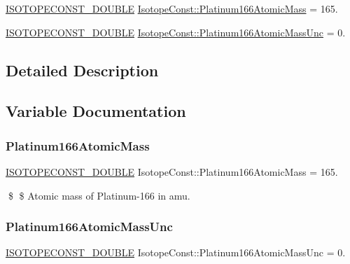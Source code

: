 \begin{DoxyCompactItemize}
\item 
\mbox{\hyperlink{group___isotope_const-_macros_ga8f45a7272ce02c0b4c65c44636ed719a}{I\+S\+O\+T\+O\+P\+E\+C\+O\+N\+S\+T\+\_\+\+D\+O\+U\+B\+LE}} \mbox{\hyperlink{group___isotope_const-_platinum-_pt166_ga0bc204d36fd2ba76383b62f562e490cd}{Isotope\+Const\+::\+Platinum166\+Atomic\+Mass}} = 165.
\item 
\mbox{\hyperlink{group___isotope_const-_macros_ga8f45a7272ce02c0b4c65c44636ed719a}{I\+S\+O\+T\+O\+P\+E\+C\+O\+N\+S\+T\+\_\+\+D\+O\+U\+B\+LE}} \mbox{\hyperlink{group___isotope_const-_platinum-_pt166_gaa3c386d9a4e07d93b30e23107e2c21b8}{Isotope\+Const\+::\+Platinum166\+Atomic\+Mass\+Unc}} = 0.
\end{DoxyCompactItemize}


\subsection{Detailed Description}


\subsection{Variable Documentation}
\mbox{\label{group___isotope_const-_platinum-_pt166_ga0bc204d36fd2ba76383b62f562e490cd}} 
\subsubsection{\texorpdfstring{Platinum166\+Atomic\+Mass}{Platinum166AtomicMass}}
{\footnotesize\ttfamily \mbox{\hyperlink{group___isotope_const-_macros_ga8f45a7272ce02c0b4c65c44636ed719a}{I\+S\+O\+T\+O\+P\+E\+C\+O\+N\+S\+T\+\_\+\+D\+O\+U\+B\+LE}} Isotope\+Const\+::\+Platinum166\+Atomic\+Mass = 165.}

\$ \$ Atomic mass of Platinum-\/166 in amu. \mbox{\label{group___isotope_const-_platinum-_pt166_gaa3c386d9a4e07d93b30e23107e2c21b8}} 
\subsubsection{\texorpdfstring{Platinum166\+Atomic\+Mass\+Unc}{Platinum166AtomicMassUnc}}
{\footnotesize\ttfamily \mbox{\hyperlink{group___isotope_const-_macros_ga8f45a7272ce02c0b4c65c44636ed719a}{I\+S\+O\+T\+O\+P\+E\+C\+O\+N\+S\+T\+\_\+\+D\+O\+U\+B\+LE}} Isotope\+Const\+::\+Platinum166\+Atomic\+Mass\+Unc = 0.}

